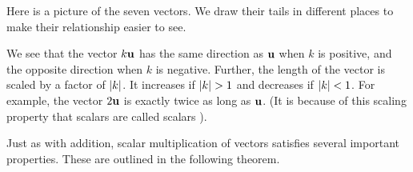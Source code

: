 \begin{solution}
  Here is a picture of the seven vectors. We draw their tails in
  different places to make their relationship easier to see.
  \begin{center}
  \end{center}
  We see that the vector $k\vect{u}$ has the same direction as
  $\vect{u}$ when $k$ is positive, and the opposite direction when $k$
  is negative. Further, the length of the vector is scaled by a factor
  of $\left|k\right|$. It increases if $\abs{k}>1$ and decreases if
  $\left|k\right|<1$. For example, the vector $2\vect{u}$ is exactly twice as
  long as $\vect{u}$.  (It is because of this scaling property that
  scalars are called scalars%
  ).
\end{solution}

Just as with addition, scalar multiplication of vectors satisfies
several important properties. These are outlined in the following
theorem.

